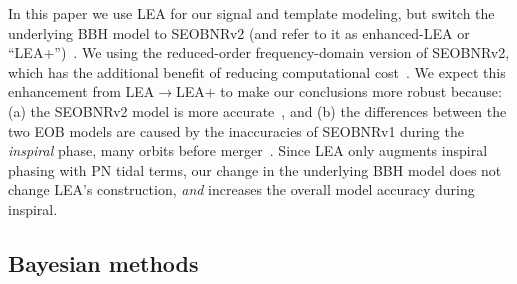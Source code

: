 \documentclass[aps,prd,amsmath,floats,floatfix, twocolumn,
superscriptaddress,nofootinbib,showpacs]{revtex4-1}
\newcommand{\red}{\textcolor{red}}
\begin{document}
In this paper we use LEA for our signal and template modeling, but switch the 
underlying BBH model to SEOBNRv2 (and refer to it as enhanced-LEA or
``LEA+'')~\cite{Taracchini:2013rva}. We using the reduced-order
frequency-domain version of SEOBNRv2, which has the additional benefit of
reducing computational cost~\cite{Purrer:2015tud}. We expect this enhancement
from LEA$\rightarrow$LEA+ to make our conclusions more robust because: (a) the 
SEOBNRv2 model is more accurate~\cite{Kumar:2015tha,Kumar:2016dhh}, and (b)
the differences between the two EOB models are caused by the
inaccuracies of SEOBNRv1 during the {\it inspiral} phase, many orbits before 
merger~\cite{Kumar:2015tha}.
Since LEA only augments inspiral phasing with PN tidal terms, our
change in the underlying BBH model does not change LEA's construction, {\it and}
increases the overall model accuracy during inspiral.


\subsection{Bayesian methods}\label{s2:bayesian}
\end{document}
